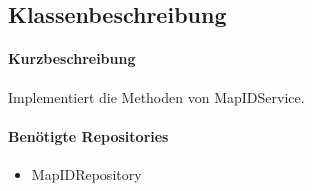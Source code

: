 \subsection*{Klassenbeschreibung}%
\paragraph*{Kurzbeschreibung}
Implementiert die Methoden von MapIDService.
\paragraph*{Benötigte Repositories}
\begin{itemize}
    \item MapIDRepository
\end{itemize}
